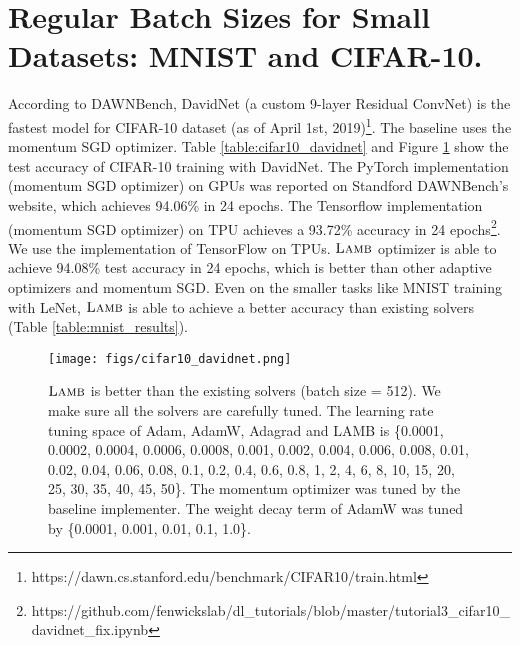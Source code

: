 \documentclass{article} \usepackage{iclr2020_conference,times}
\newcommand{\lamb}{\textsc{Lamb}}
\begin{document}
\section{Regular Batch Sizes for Small Datasets: MNIST and CIFAR-10.}
According to DAWNBench, DavidNet (a custom 9-layer Residual ConvNet) is the fastest model for CIFAR-10 dataset (as of April 1st, 2019)\footnote{https://dawn.cs.stanford.edu/benchmark/CIFAR10/train.html}.
The baseline uses the momentum SGD optimizer.
Table \ref{table:cifar10_davidnet} and Figure \ref{fig:cifar10_davidnet} show the test accuracy of CIFAR-10 training with DavidNet. The PyTorch implementation (momentum SGD optimizer) on GPUs was reported on Standford DAWNBench's website, which achieves 94.06\% in 24 epochs. The Tensorflow implementation (momentum SGD optimizer) on TPU achieves a 93.72\% accuracy in 24 epochs\footnote{https://github.com/fenwickslab/dl\_tutorials/blob/master/tutorial3\_cifar10\_davidnet\_fix.ipynb}. We use the implementation of TensorFlow on TPUs. $\lamb$ optimizer is able to achieve 94.08\% test accuracy in 24 epochs, which is better than other adaptive optimizers and momentum SGD.
Even on the smaller tasks like MNIST training with LeNet, $\lamb$ is able to achieve a better accuracy than existing solvers (Table \ref{table:mnist_results}).


\begin{figure*}[tb]
\vspace{5pt}
\centering
\texttt{[image: figs/cifar10\_davidnet.png]}
\caption{$\lamb$ is better than the existing solvers (batch size = 512). We make sure all the solvers are carefully tuned. The learning rate tuning space of Adam, AdamW, Adagrad and LAMB is \{0.0001, 0.0002, 0.0004, 0.0006, 0.0008, 0.001, 0.002, 0.004, 0.006, 0.008, 0.01, 0.02, 0.04, 0.06, 0.08, 0.1, 0.2, 0.4, 0.6, 0.8, 1, 2, 4, 6, 8, 10, 15, 20, 25, 30, 35, 40, 45, 50\}. The momentum optimizer was tuned by the baseline implementer. The weight decay term of AdamW was tuned by \{0.0001, 0.001, 0.01, 0.1, 1.0\}.}
\label{fig:cifar10_davidnet}
\vspace{-10pt}
\end{figure*}
\end{document}
